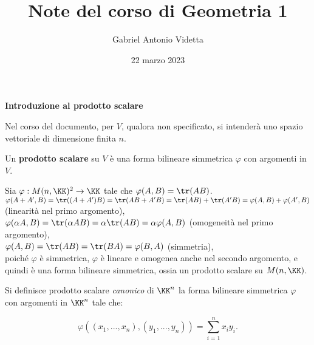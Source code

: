\documentclass[11pt]{article}
\title{\textbf{Note del corso di Geometria 1}}
\author{Gabriel Antonio Videtta}
\date{22 marzo 2023}
\begin{document}
	
	\maketitle
	
	\begin{center}
		\Large \textbf{Introduzione al prodotto scalare}
	\end{center}

	\begin{note}
		Nel corso del documento, per $V$, qualora non specificato, si intenderà uno spazio vettoriale di dimensione
		finita $n$.
	\end{note}

	\begin{definition}
		Un \textbf{prodotto scalare} su $V$ è una forma bilineare simmetrica $\varphi$ con argomenti in $V$.
	\end{definition}

	\begin{example}
		Sia $\varphi : M(n, \KK)^2 \to \KK$ tale che $\varphi(A, B) = \tr(AB)$. \\
		
		\li $\varphi(A + A', B) = \tr((A + A')B) = \tr(AB + A'B) = \tr(AB) + \tr(A'B) = \varphi(A, B) + \varphi(A', B)$ (linearità
		nel primo argomento), \\
		\li $\varphi(\alpha A, B) = \tr(\alpha A B) = \alpha \tr(AB) = \alpha \varphi(A, B)$ (omogeneità nel primo argomento), \\
		\li $\varphi(A, B) = \tr(AB) = \tr(BA) = \varphi(B, A)$ (simmetria), \\
		\li poiché $\varphi$ è simmetrica, $\varphi$ è lineare e omogenea anche nel secondo argomento, e quindi è una
		forma bilineare simmetrica, ossia un prodotto scalare su $M(n, \KK)$.
	\end{example}

	\begin{definition}
		Si definisce prodotto scalare \textit{canonico} di $\KK^n$ la forma bilineare simmetrica $\varphi$ con
		argomenti in $\KK^n$ tale che:
		
		\[ \varphi((x_1, ..., x_n), (y_1, ..., y_n)) = \sum_{i=1}^n x_i y_i. \]
	\end{definition}
\end{document}
